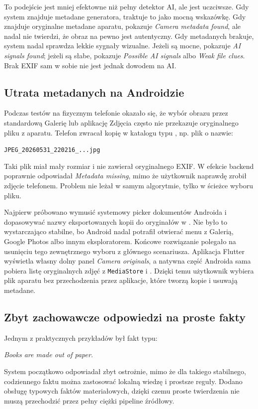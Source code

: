 \documentclass[12pt,a4paper]{article}
\begin{document}
To podejście jest mniej efektowne niż pełny detektor AI, ale jest uczciwsze.
Gdy system znajduje metadane generatora, traktuje to jako mocną wskazówkę.
Gdy znajduje oryginalne metadane aparatu, pokazuje \textit{Camera metadata found}, ale nadal nie twierdzi, że obraz na pewno jest autentyczny.
Gdy metadanych brakuje, system nadal sprawdza lekkie sygnały wizualne.
Jeżeli są mocne, pokazuje \textit{AI signals found}; jeżeli są słabe, pokazuje \textit{Possible AI signals} albo \textit{Weak file clues}.
Brak EXIF sam w sobie nie jest jednak dowodem na AI.

\subsection{Utrata metadanych na Androidzie}
Podczas testów na fizycznym telefonie okazało się, że wybór obrazu przez standardową Galerię lub aplikację Zdjęcia często nie przekazuje oryginalnego pliku z aparatu.
Telefon zwracał kopię w katalogu typu , np. plik o nazwie:
\begin{center}
\texttt{JPEG\_20260531\_220216\_...jpg}
\end{center}
Taki plik miał mały rozmiar i nie zawierał oryginalnego EXIF.
W efekcie backend poprawnie odpowiadał \textit{Metadata missing}, mimo że użytkownik naprawdę zrobił zdjęcie telefonem.
Problem nie leżał w samym algorytmie, tylko w ścieżce wyboru pliku.

Najpierw próbowano wymusić systemowy picker dokumentów Androida i dopasowywać nazwy eksportowanych kopii do oryginałów w .
Nie było to wystarczająco stabilne, bo Android nadal potrafił otwierać menu z Galerią, Google Photos albo innym eksploratorem.
Końcowe rozwiązanie polegało na usunięciu tego zewnętrznego wyboru z głównego scenariusza.
Aplikacja Flutter wyświetla własny dolny panel \textit{Camera originals}, a natywna część Androida sama pobiera listę oryginalnych zdjęć z \texttt{MediaStore} i .
Dzięki temu użytkownik wybiera plik aparatu bez przechodzenia przez aplikacje, które tworzą kopie i usuwają metadane.

\subsection{Zbyt zachowawcze odpowiedzi na proste fakty}
Jednym z praktycznych przykładów był fakt typu:
\begin{center}
\textit{Books are made out of paper.}
\end{center}
System początkowo odpowiadał zbyt ostrożnie, mimo że dla takiego stabilnego, codziennego faktu można zastosować lokalną wiedzę i prostsze reguły.
Dodano obsługę typowych faktów materiałowych, dzięki czemu proste twierdzenia nie muszą przechodzić przez pełny ciężki pipeline źródłowy.
\end{document}

